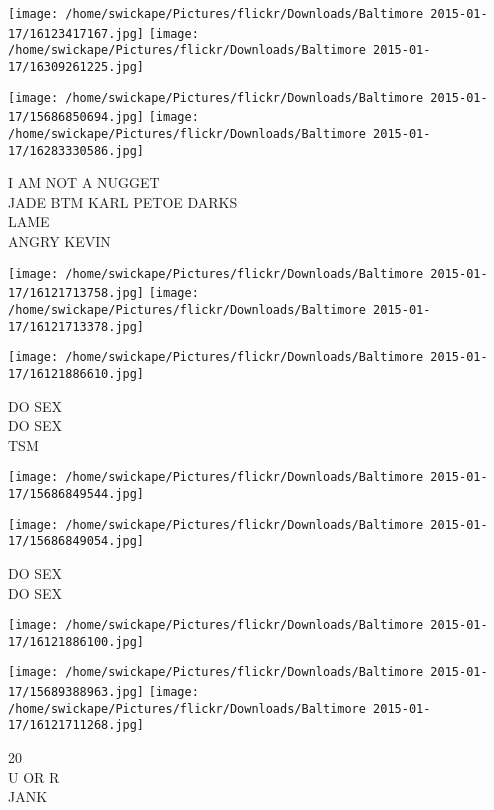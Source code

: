 \documentclass[10pt,letterpaper]{article}
\begin{document}
\texttt{[image: /home/swickape/Pictures/flickr/Downloads/Baltimore 2015-01-17/16123417167.jpg]}
\texttt{[image: /home/swickape/Pictures/flickr/Downloads/Baltimore 2015-01-17/16309261225.jpg]}

\texttt{[image: /home/swickape/Pictures/flickr/Downloads/Baltimore 2015-01-17/15686850694.jpg]}
\texttt{[image: /home/swickape/Pictures/flickr/Downloads/Baltimore 2015-01-17/16283330586.jpg]}

I AM NOT A NUGGET\\
JADE BTM KARL PETOE DARKS\\
LAME\\
ANGRY KEVIN\\
\pagebreak

\texttt{[image: /home/swickape/Pictures/flickr/Downloads/Baltimore 2015-01-17/16121713758.jpg]}
\texttt{[image: /home/swickape/Pictures/flickr/Downloads/Baltimore 2015-01-17/16121713378.jpg]}

\vspace{0.25in}
\texttt{[image: /home/swickape/Pictures/flickr/Downloads/Baltimore 2015-01-17/16121886610.jpg]}

DO SEX\\
DO SEX\\
TSM\\
\pagebreak

\texttt{[image: /home/swickape/Pictures/flickr/Downloads/Baltimore 2015-01-17/15686849544.jpg]}

\vspace{0.25in}
\texttt{[image: /home/swickape/Pictures/flickr/Downloads/Baltimore 2015-01-17/15686849054.jpg]}

DO SEX\\
DO SEX\\
\pagebreak

\texttt{[image: /home/swickape/Pictures/flickr/Downloads/Baltimore 2015-01-17/16121886100.jpg]}

\vspace{0.25in}
\texttt{[image: /home/swickape/Pictures/flickr/Downloads/Baltimore 2015-01-17/15689388963.jpg]}
\texttt{[image: /home/swickape/Pictures/flickr/Downloads/Baltimore 2015-01-17/16121711268.jpg]}

20\\
U OR R\\
JANK\\
\pagebreak
\end{document}

